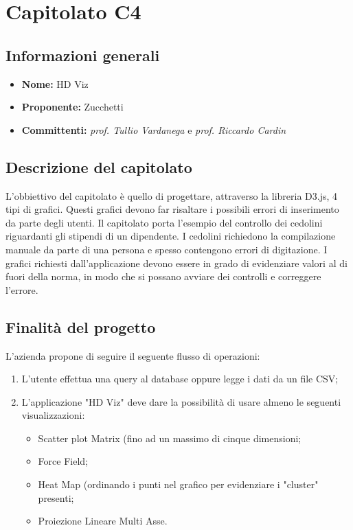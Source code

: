 \section{Capitolato C4}

\subsection{Informazioni generali}
\begin{itemize}
\item \textbf{Nome:} HD Viz
\item \textbf{Proponente:} Zucchetti
\item \textbf{Committenti:} \textit{prof. Tullio Vardanega} e \textit{prof. Riccardo Cardin}
\end{itemize}

\subsection{Descrizione del capitolato}
L'obbiettivo del capitolato è quello di progettare, attraverso la libreria D3.js, 4 tipi di grafici. Questi grafici devono far risaltare i possibili errori di inserimento da parte degli utenti.
Il capitolato porta l'esempio del controllo dei cedolini riguardanti gli stipendi di un dipendente. I cedolini richiedono la compilazione manuale da parte di una persona e spesso contengono errori di digitazione. I grafici richiesti dall'applicazione devono essere in grado di evidenziare valori al di fuori della norma, in modo che si possano avviare dei controlli e correggere l'errore.

\subsection{Finalità del progetto}
L'azienda propone di seguire il seguente flusso di operazioni:
\begin{enumerate}
\item L'utente effettua una query al database oppure legge i dati da un file CSV;
\item L'applicazione "HD Viz" deve dare la possibilità di usare almeno le seguenti visualizzazioni:
	\begin{itemize}
	\item Scatter plot Matrix (fino ad un massimo di cinque dimensioni;
	\item Force Field;
	\item Heat Map (ordinando i punti nel grafico per evidenziare i "cluster" presenti;
	\item Proiezione Lineare Multi Asse.
	\end{itemize}
\end{enumerate}

